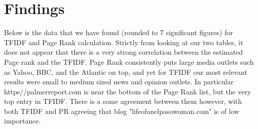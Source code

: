 \documentclass[11pt]{article}
\begin{document}
	\section{Findings}
	\hspace{10mm} Below is the data that we have found (rounded to 7 significant figures) for TFIDF and Page Rank calculation. Strictly from looking at our two tables, it does not appear that there is a very strong correlation between the estimated Page rank and the TFIDF. Page Rank consistently puts large media outlets such as Yahoo, BBC, and the Atlantic on top, and yet for TFIDF our most relevant results were small to medium sized news and opinion outlets. In particular https//palmerreport.com is near the bottom of the Page Rank list, but the very top entry in TFIDF. There is a some agreement between them however, with both TFIDF and PR agreeing that blog "lifeofanelpasowoman.com" is of low importance. 
\end{document}
